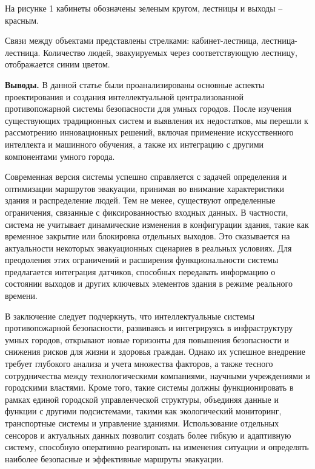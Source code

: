 \begin{multicols}{2}
На рисунке 1 кабинеты обозначены зеленым кругом, лестницы и выходы --
красным.

Связи между объектами представлены стрелками: кабинет-лестница,
лестница-лестница. Количество людей, эвакуируемых через соответствующую
лестницу, отображается синим цветом.

{\bfseries Выводы.} В данной статье были проанализированы основные аспекты
проектирования и создания интеллектуальной централизованной
противопожарной системы безопасности для умных городов. После изучения
существующих традиционных систем и выявления их недостатков, мы перешли
к рассмотрению инновационных решений, включая применение искусственного
интеллекта и машинного обучения, а также их интеграцию с другими
компонентами умного города.

Современная версия системы успешно справляется с задачей определения и
оптимизации маршрутов эвакуации, принимая во внимание характеристики
здания и распределение людей. Тем не менее, существуют определенные
ограничения, связанные с фиксированностью входных данных. В частности,
система не учитывает динамические изменения в конфигурации здания, такие
как временное закрытие или блокировка отдельных выходов. Это сказывается
на актуальности некоторых эвакуационных сценариев в реальных условиях.
Для преодоления этих ограничений и расширения функциональности системы
предлагается интеграция датчиков, способных передавать информацию о
состоянии выходов и других ключевых элементов здания в режиме реального
времени.

В заключение следует подчеркнуть, что интеллектуальные системы
противопожарной безопасности, развиваясь и интегрируясь в инфраструктуру
умных городов, открывают новые горизонты для повышения безопасности и
снижения рисков для жизни и здоровья граждан. Однако их успешное
внедрение требует глубокого анализа и учета множества факторов, а также
тесного сотрудничества между технологическими компаниями, научными
учреждениями и городскими властями. Кроме того, такие системы должны
функционировать в рамках единой городской управленческой структуры,
объединяя данные и функции с другими подсистемами, такими как
экологический мониторинг, транспортные системы и управление зданиями.
Использование отдельных сенсоров и актуальных данных позволит создать
более гибкую и адаптивную систему, способную оперативно реагировать на
изменения ситуации и определять наиболее безопасные и эффективные
маршруты эвакуации.


\end{multicols}
